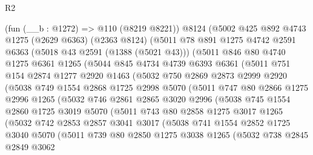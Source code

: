 \begin{lexlean}{R2}
\begin{coremodule}
    (fun (__b : @1272) => @110 (@8219 @8221))
    @8124
    (@5002
      @425
      @892
      @4743
      @1275
      (@2629 @6363)
      (@2363 @8124)
      (@5011
        @78
        @891
        @1275
        @4742
        @2591
        @6363
        (@5018 @43 @2591 (@1388 (@5021 @43)))
        (@5011
          @846
          @80
          @4740
          @1275
          @6361
          @1265
          (@5044
            @845
            @4734
            @4739
            @6393
            @6361
            (@5011
              @751
              @154
              @2874
              @1277
              @2920
              @1463
              (@5032
                @750
                @2869
                @2873
                @2999
                @2920
                (@5038
                  @749
                  @1554
                  @2868
                  @1725
                  @2998
                  @5070
                  (@5011
                    @747
                    @80
                    @2866
                    @1275
                    @2996
                    @1265
                    (@5032
                      @746
                      @2861
                      @2865
                      @3020
                      @2996
                      (@5038
                        @745
                        @1554
                        @2860
                        @1725
                        @3019
                        @5070
                        (@5011
                          @743
                          @80
                          @2858
                          @1275
                          @3017
                          @1265
                          (@5032
                            @742
                            @2853
                            @2857
                            @3041
                            @3017
                            (@5038
                              @741
                              @1554
                              @2852
                              @1725
                              @3040
                              @5070
                              (@5011
                                @739
                                @80
                                @2850
                                @1275
                                @3038
                                @1265
                                (@5032
                                  @738
                                  @2845
                                  @2849
                                  @3062

\end{coremodule}
\end{lexlean}
